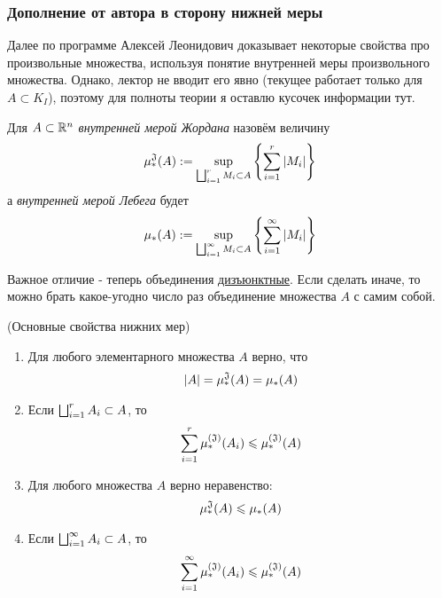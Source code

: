 \subsubsection*{Дополнение от автора в сторону нижней меры}

\begin{anote}
	Далее по программе Алексей Леонидович доказывает некоторые свойства про произвольные множества, используя понятие внутренней меры произвольного множества. Однако, лектор не вводит его явно (текущее работает только для $A \subset K_I$), поэтому для полноты теории я оставлю кусочек информации тут.
\end{anote}

\begin{definition}
	Для $A \subset \mathbb{R}^n $ \textit{внутренней мерой Жордана} назовём величину
	\[
		\operatorname{\mu^\mathfrak{J}_*}(A) := \sup_{\bigsqcup_{i = 1}^r M_i \subset A} \left\{\sum_{i = 1}^r |M_i|\right\}
	\]
	а \textit{внутренней мерой Лебега} будет
	\[
		\mu_*(A) := \sup_{\bigsqcup_{i = 1}^\infty M_i \subset A} \left\{\sum_{i = 1}^\infty |M_i|\right\}
	\]
\end{definition}

\begin{anote}
	Важное отличие - теперь объединения \underline{дизъюнктные}. Если сделать иначе, то можно брать какое-угодно число раз объединение множества $A$ с самим собой.
\end{anote}

\begin{theorem} (Основные свойства нижних мер)
	\begin{enumerate}
		\item Для любого элементарного множества $A$ верно, что
		\[
			|A| = \operatorname{\mu^\mathfrak{J}_*}(A) = \mu_*(A)
		\]
		
		\item Если $\bigsqcup_{i = 1}^r A_i \subset A$, то
		\[
			\sum_{i = 1}^r \operatorname{\mu^{(\mathfrak{J})}_*}(A_i) \leqslant \operatorname{\mu^{(\mathfrak{J})}_*}(A)
		\]
		
		\item Для любого множества $A$ верно неравенство:
		\[
			\operatorname{\mu^\mathfrak{J}_*}(A) \leqslant \mu_*(A)
		\]
		
		\item Если $\bigsqcup_{i = 1}^\infty A_i \subset A$, то
		\[
			\sum_{i = 1}^\infty \operatorname{\mu^{(\mathfrak{J})}_*}(A_i) \leqslant \operatorname{\mu^{(\mathfrak{J})}_*}(A)
		\]
	\end{enumerate}
\end{theorem}

